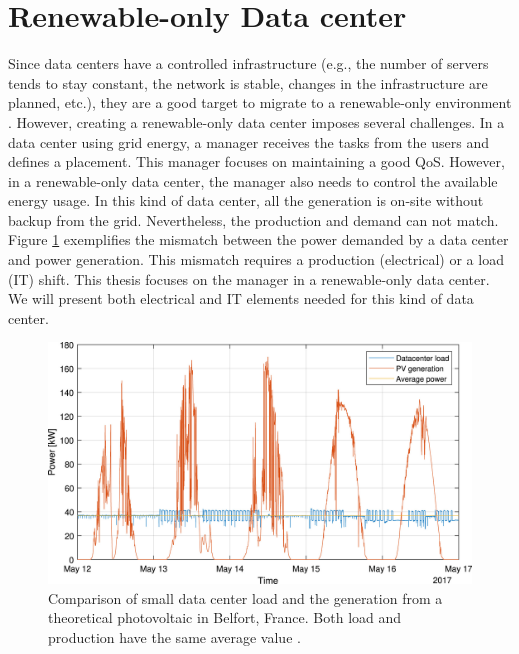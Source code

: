 \section{Renewable-only Data center}
Since data centers have a controlled infrastructure (e.g., the number of servers tends to stay constant, the network is stable, changes in the infrastructure are planned, etc.), they are a good target to migrate to a renewable-only environment \cite{rostirolla2022survey}. However, creating a renewable-only data center imposes several challenges. In a data center using grid energy, a manager receives the tasks from the users and defines a placement. This manager focuses on maintaining a good QoS. However, in a renewable-only data center, the manager also needs to control the available energy usage. In this kind of data center, all the generation is on-site without backup from the grid. Nevertheless, the production and demand can not match. Figure \ref{fig:load_production} exemplifies the mismatch between the power demanded by a data center and power generation. This mismatch requires a production (electrical) or a load (IT) shift. This thesis focuses on the manager in a renewable-only data center. We will present both electrical and IT elements needed for this kind of data center.

\begin{figure}[!htb]
    \centering
    \includegraphics[scale=1]{Images/Related_works/load_production.jpg}
    \caption[Comparison of small data center load and the generation from a theoretical photovoltaic in Belfort, France. Both load and production have the same average value.]{Comparison of small data center load and the generation from a theoretical photovoltaic in Belfort, France. Both load and production have the same average value \cite{rostirolla2022survey}.}
    \label{fig:load_production}
\end{figure}

